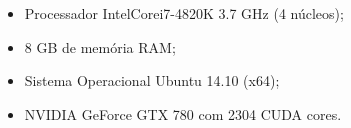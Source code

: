\begin{itemize}
    \item Processador Intel\textregistered Core\texttrademark i7-4820K 3.7 GHz (4 núcleos);
    \item 8 GB de memória RAM;
    \item Sistema Operacional Ubuntu 14.10 (x64);
    \item NVIDIA GeForce GTX 780 com 2304 CUDA cores.
\end{itemize}










